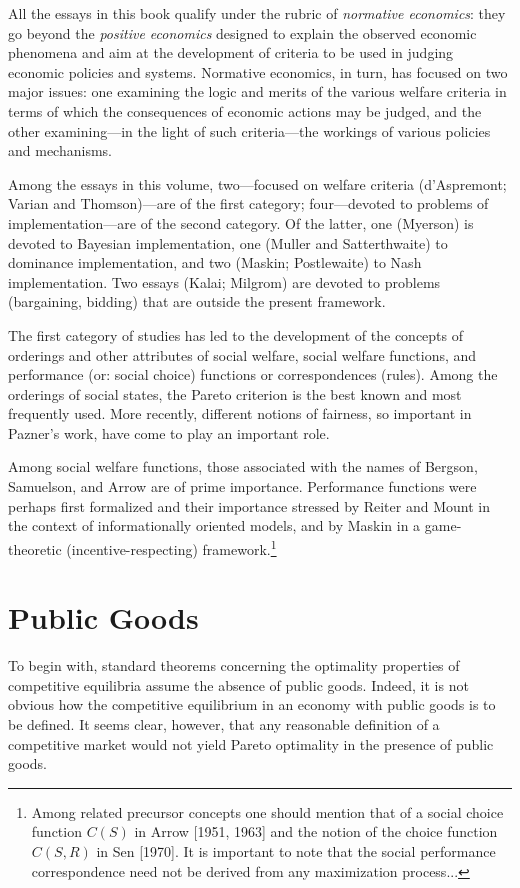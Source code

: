 \documentclass[12pt]{article}
\begin{document}
All the essays in this book qualify under the rubric of \textit{normative economics}: they go beyond the \textit{positive economics} designed to explain the observed economic phenomena and aim at the development of criteria to be used in judging economic policies and systems. Normative economics, in turn, has focused on two major issues: one examining the logic and merits of the various welfare criteria in terms of which the consequences of economic actions may be judged, and the other examining---in the light of such criteria---the workings of various policies and mechanisms.

Among the essays in this volume, two---focused on welfare criteria (d'Aspremont; Varian and Thomson)---are of the first category; four---devoted to problems of implementation---are of the second category. Of the latter, one (Myerson) is devoted to Bayesian implementation, one (Muller and Satterthwaite) to dominance implementation, and two (Maskin; Postlewaite) to Nash implementation. Two essays (Kalai; Milgrom) are devoted to problems (bargaining, bidding) that are outside the present framework.

The first category of studies has led to the development of the concepts of orderings and other attributes of social welfare, social welfare functions, and performance (or: social choice) functions or correspondences (rules). Among the orderings of social states, the Pareto criterion is the best known and most frequently used. More recently, different notions of fairness, so important in Pazner's work, have come to play an important role. 

Among social welfare functions, those associated with the names of Bergson, Samuelson, and Arrow are of prime importance. Performance functions were perhaps first formalized and their importance stressed by Reiter and Mount in the context of informationally oriented models, and by Maskin in a game-theoretic (incentive-respecting) framework.\footnote{Among related precursor concepts one should mention that of a social choice function $C(S)$ in Arrow [1951, 1963] and the notion of the choice function $C(S, R)$ in Sen [1970]. It is important to note that the social performance correspondence need not be derived from any maximization process...}

\section*{Public Goods}

To begin with, standard theorems concerning the optimality properties of competitive equilibria assume the absence of public goods. Indeed, it is not obvious how the competitive equilibrium in an economy with public goods is to be defined. It seems clear, however, that any reasonable definition of a competitive market would not yield Pareto optimality in the presence of public goods. 
\end{document}
